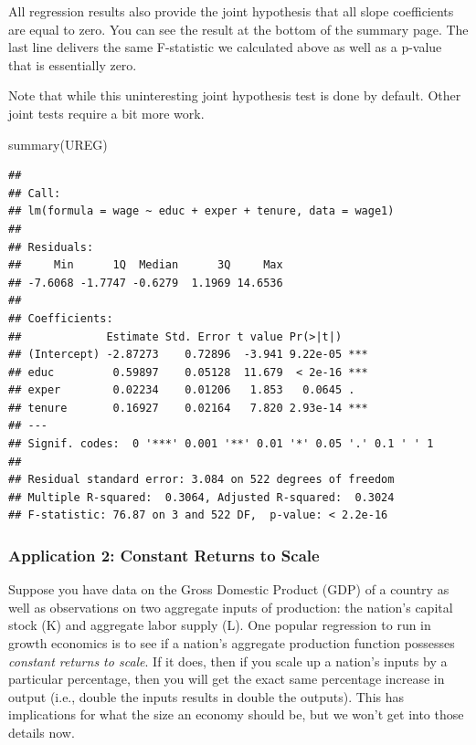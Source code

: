 \documentclass[
]{book}
\newenvironment{Shaded}{\begin{snugshade}}{\end{snugshade}}
\newcommand{\FunctionTok}[1]{\textcolor[rgb]{0.00,0.00,0.00}{#1}}
\newcommand{\NormalTok}[1]{#1}
\begin{document}
All regression results also provide the joint hypothesis that all slope coefficients are equal to zero. You can see the result at the bottom of the summary page. The last line delivers the same F-statistic we calculated above as well as a p-value that is essentially zero.

Note that while this uninteresting joint hypothesis test is done by default. Other joint tests require a bit more work.

\begin{Shaded}
\begin{Highlighting}[]
\FunctionTok{summary}\NormalTok{(UREG)}
\end{Highlighting}
\end{Shaded}

\begin{verbatim}
## 
## Call:
## lm(formula = wage ~ educ + exper + tenure, data = wage1)
## 
## Residuals:
##     Min      1Q  Median      3Q     Max 
## -7.6068 -1.7747 -0.6279  1.1969 14.6536 
## 
## Coefficients:
##             Estimate Std. Error t value Pr(>|t|)    
## (Intercept) -2.87273    0.72896  -3.941 9.22e-05 ***
## educ         0.59897    0.05128  11.679  < 2e-16 ***
## exper        0.02234    0.01206   1.853   0.0645 .  
## tenure       0.16927    0.02164   7.820 2.93e-14 ***
## ---
## Signif. codes:  0 '***' 0.001 '**' 0.01 '*' 0.05 '.' 0.1 ' ' 1
## 
## Residual standard error: 3.084 on 522 degrees of freedom
## Multiple R-squared:  0.3064, Adjusted R-squared:  0.3024 
## F-statistic: 76.87 on 3 and 522 DF,  p-value: < 2.2e-16
\end{verbatim}

\hypertarget{application-2-constant-returns-to-scale}{%
\subsubsection*{Application 2: Constant Returns to Scale}\label{application-2-constant-returns-to-scale}}

Suppose you have data on the Gross Domestic Product (GDP) of a country as well as observations on two aggregate inputs of production: the nation's capital stock (K) and aggregate labor supply (L). One popular regression to run in growth economics is to see if a nation's aggregate production function possesses \emph{constant returns to scale}. If it does, then if you scale up a nation's inputs by a particular percentage, then you will get the exact same percentage increase in output (i.e., double the inputs results in double the outputs). This has implications for what the size an economy should be, but we won't get into those details now.
\end{document}
